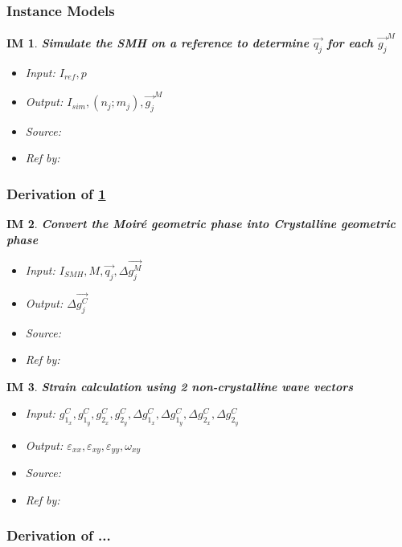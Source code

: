 \documentclass[12pt]{article}
\newtheorem{IM}{IM}
\begin{document}
\subsubsection{Instance Models} \label{sec_instance}    

\begin{IM}
\normalfont \textbf{Simulate the SMH on a reference to determine $\overrightarrow{q_{j}}$ for each $\vec{g_j}^{M}$}
\begin{itemize}
\item Input: $I_{ref}, p$
\item Output: $I_{sim}, (n_{j};m_{j}), \vec{g_j}^{M}$
\item Source:
\item Ref by:
\end{itemize}
\label{IM_1}
\end{IM}

\subsubsection*{Derivation of \cref{IM_1}}

\begin{IM}
\normalfont \textbf{Convert the Moir{\'e} geometric phase into Crystalline geometric phase}
\begin{itemize}
\item Input: $I_{SMH}, M, \overrightarrow{q_{j}}, \Delta \overrightarrow{g_{j}^{M}}$
\item Output: $\Delta \overrightarrow{g_{j}^{C}}$
\item Source:
\item Ref by:
\end{itemize}
\label{IM_2}
\end{IM}

\begin{IM}
\normalfont \textbf{Strain calculation using 2 non-crystalline wave vectors}
\begin{itemize}
\item Input: $g_{1_{x}}^{C}, g_{1_{y}}^{C},g_{2_{x}}^{C}, g_{2_{y}}^{C}, \Delta g_{1_{x}}^{C}, \Delta g_{1_{y}}^{C},\Delta g_{2_{x}}^{C},\Delta g_{2_{y}}^{C}$
\item Output: $\varepsilon_{xx},\varepsilon_{xy},\varepsilon_{yy},\omega_{xy}$
\item Source:
\item Ref by:
\end{itemize}
\label{IM_3}
\end{IM}


\subsubsection*{Derivation of ...}
\end{document}
